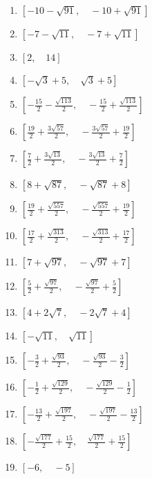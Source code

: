 \documentclass[9pt,dvipdfmx,a4paper]{article}
\begin{document}
\begin{multicols}{2}
\begin{enumerate}
\item
$ \left [ -10 - \sqrt{91}, \quad -10 + \sqrt{91}\right ]$

\item
$ \left [ -7 - \sqrt{11}, \quad -7 + \sqrt{11}\right ]$

\item
$ \left [ 2, \quad 14\right ]$

\item
$ \left [ - \sqrt{3} + 5, \quad \sqrt{3} + 5\right ]$

\item
$ \left [ - \frac{15}{2} - \frac{\sqrt{113}}{2}, \quad - \frac{15}{2} + \frac{\sqrt{113}}{2}\right ]$

\item
$ \left [ \frac{19}{2} + \frac{3 \sqrt{57}}{2}, \quad - \frac{3 \sqrt{57}}{2} + \frac{19}{2}\right ]$

\item
$ \left [ \frac{7}{2} + \frac{3 \sqrt{13}}{2}, \quad - \frac{3 \sqrt{13}}{2} + \frac{7}{2}\right ]$

\item
$ \left [ 8 + \sqrt{87}, \quad - \sqrt{87} + 8\right ]$

\item
$ \left [ \frac{19}{2} + \frac{\sqrt{557}}{2}, \quad - \frac{\sqrt{557}}{2} + \frac{19}{2}\right ]$

\item
$ \left [ \frac{17}{2} + \frac{\sqrt{313}}{2}, \quad - \frac{\sqrt{313}}{2} + \frac{17}{2}\right ]$

\item
$ \left [ 7 + \sqrt{97}, \quad - \sqrt{97} + 7\right ]$

\item
$ \left [ \frac{5}{2} + \frac{\sqrt{97}}{2}, \quad - \frac{\sqrt{97}}{2} + \frac{5}{2}\right ]$

\item
$ \left [ 4 + 2 \sqrt{7}, \quad - 2 \sqrt{7} + 4\right ]$

\item
$ \left [ - \sqrt{11}, \quad \sqrt{11}\right ]$

\item
$ \left [ - \frac{3}{2} + \frac{\sqrt{93}}{2}, \quad - \frac{\sqrt{93}}{2} - \frac{3}{2}\right ]$

\item
$ \left [ - \frac{1}{2} + \frac{\sqrt{129}}{2}, \quad - \frac{\sqrt{129}}{2} - \frac{1}{2}\right ]$

\item
$ \left [ - \frac{13}{2} + \frac{\sqrt{197}}{2}, \quad - \frac{\sqrt{197}}{2} - \frac{13}{2}\right ]$

\item
$ \left [ - \frac{\sqrt{177}}{2} + \frac{15}{2}, \quad \frac{\sqrt{177}}{2} + \frac{15}{2}\right ]$

\item
$ \left [ -6, \quad -5\right ]$


\end{enumerate}
\end{multicols}
\end{document}
